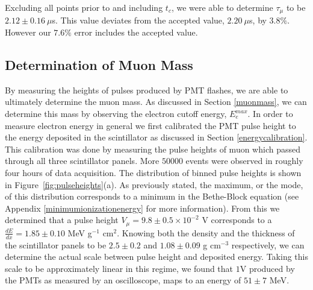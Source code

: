 Excluding all points prior to and including $t_{c}$, we were able to determine $\tau_{\mu}$ to be $2.12 \pm 0.16~\mu$s.  This value deviates from the accepted value, $2.20~\mu$s, by $3.8\%$.  However our $7.6\%$ error includes the accepted value.






\subsection{Determination of Muon Mass}\label{determinationofmuonmass}

By measuring the heights of pulses produced by PMT flashes, we are
able to ultimately determine the muon mass.  As discussed in Section
\ref{muonmass}, we can determine this mass by observing the electron cutoff energy, $E_{e}^{max}$. In order to measure electron energy in general
we first calibrated the PMT pulse height to the energy deposited in
the scintillator as discussed in Section \ref{energycalibration}. This calibration
was done by measuring the pulse heights of muon which passed through
all three scintillator panels.  More $50000$ events were observed in
roughly four hours of data acquisition.  The distribution of binned
pulse heights is shown in Figure~\ref{fig:pulseheights}(a).  As previously stated, the
maximum, or the mode, of this distribution corresponds to a minimum in
the Bethe-Block equation (see Appendix \ref{minimumionizationenergy} for more information).  From this we determined that a pulse
height $V_{\mu} = 9.8\pm0.5 \times 10^{-2}$ V corresponds to a $\frac{dE}{dx}= 1.85\pm0.10$ MeV
g$^{-1}$ cm$^{2}$.  Knowing both the density and the thickness of the
scintillator panels to be $2.5\pm0.2$ and $1.08\pm0.09$ g cm$^{-3}$ respectively, we can determine
the actual scale between pulse height and deposited energy.  Taking
this scale to be approximately linear in this regime, we found that
$1$V produced by the PMTs as measured by an oscilloscope, maps to an
energy of $51 \pm 7$ MeV.




